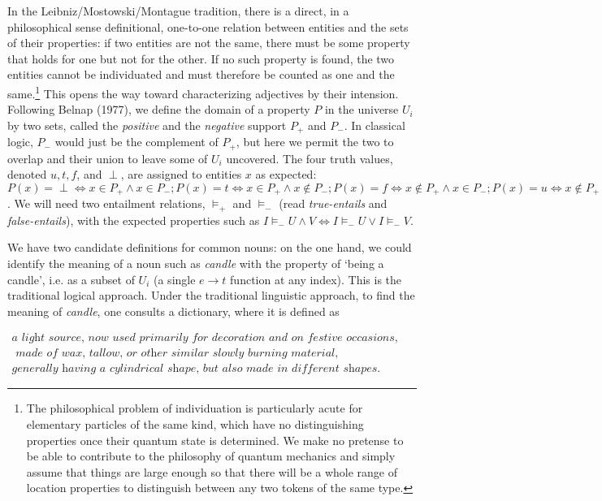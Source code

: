 In the Leibniz/Mostowski/Montague tradition, there is a direct, in a
philosophical sense definitional, one-to-one relation between entities and the
sets of their properties: if two entities are not the same, there must be some
property that holds for one but not for the other. If no such property is
found, the two entities cannot be individuated and must therefore be counted
as one and the same.\footnote{The philosophical problem of individuation is
  particularly acute for elementary particles of the same kind, which have no
  distinguishing properties once their quantum state is determined. We make no
  pretense to be able to contribute to the philosophy of quantum mechanics and
  simply assume that things are large enough so that there will be a whole
  range of location properties to distinguish between any two tokens of the
  same type.} This opens the way toward characterizing adjectives by their
intension. Following Belnap (1977), we define the domain of a property $P$ in
the universe $U_i$ by two sets, called the {\it positive} and the {\it
  negative} support $P_+$ and $P_-$. In classical logic, $P_-$ would just be
the complement of $P_+$, but here we permit the two to overlap and their union
to leave some of $U_i$ uncovered. The four truth values, denoted $u, t, f$,
and $\perp$, are assigned to entities $x$ as expected: $P(x)=\perp
\Leftrightarrow x \in P_+ \wedge x \in P_-; P(x) = t \Leftrightarrow x \in P_+
\wedge x \not\in P_-; P(x)=f \Leftrightarrow x \not\in P_+ \wedge x \in P_-;
P(x)=u \Leftrightarrow x \not\in P_+ \wedge x \not\in P_-$. We will need two
entailment relations, $\models_+$ and $\models_-$ (read {\it true-entails} and
{\it false-entails}), with the expected properties such as $I \models_- U
\wedge V \Leftrightarrow I \models_- U \vee I \models_- V$.

We have two candidate definitions for common nouns: on the one hand, we could
identify the meaning of a noun such as {\it candle} with the property of
`being a candle', i.e.  as a subset of $U_i$ (a single $e \rightarrow t$
function at any index). This is the traditional logical approach. Under the
traditional linguistic approach, to find the meaning of {\it candle}, one
consults a dictionary, where it is defined as

\begin{eqnarray}
\textit{a light source, now used primarily for
  decoration and on festive occasions,}\ \ \ \ \ \ \ \\\nonumber
\textit{ made of wax, tallow, or other similar
  slowly burning material,}\\\nonumber
\textit{generally having a cylindrical shape, but also made
  in different shapes.}
\end{eqnarray}


